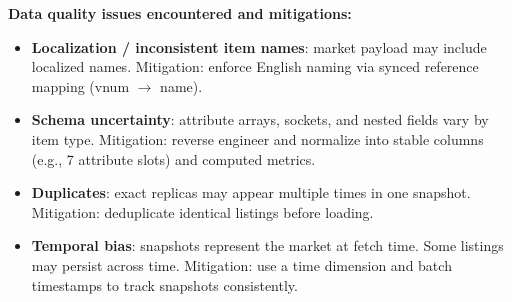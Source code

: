 \begin{riskbox}
\textbf{Data quality issues encountered and mitigations:}
\begin{itemize}
  \item \textbf{Localization / inconsistent item names}: market payload may include localized names. 
  Mitigation: enforce English naming via synced reference mapping (vnum $\rightarrow$ name).

  \item \textbf{Schema uncertainty}: attribute arrays, sockets, and nested fields vary by item type. 
  Mitigation: reverse engineer and normalize into stable columns (e.g., 7 attribute slots) and computed metrics.

  \item \textbf{Duplicates}: exact replicas may appear multiple times in one snapshot. 
  Mitigation: deduplicate identical listings before loading.

  \item \textbf{Temporal bias}: snapshots represent the market at fetch time. Some listings may persist across time. 
  Mitigation: use a time dimension and batch timestamps to track snapshots consistently.
\end{itemize}
\end{riskbox}


